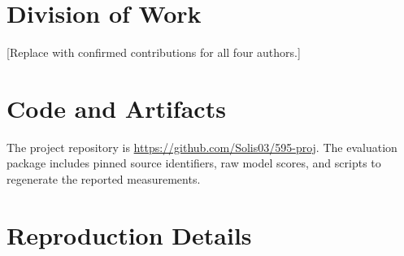 \documentclass[11pt]{article}
\begin{document}
\section*{Division of Work}
[Replace with confirmed contributions for all four authors.]

\section*{Code and Artifacts}
The project repository is \url{https://github.com/Solis03/595-proj}.
The evaluation package includes pinned source identifiers, raw model
scores, and scripts to regenerate the reported measurements.



\appendix
\section{Reproduction Details}

\end{document}
